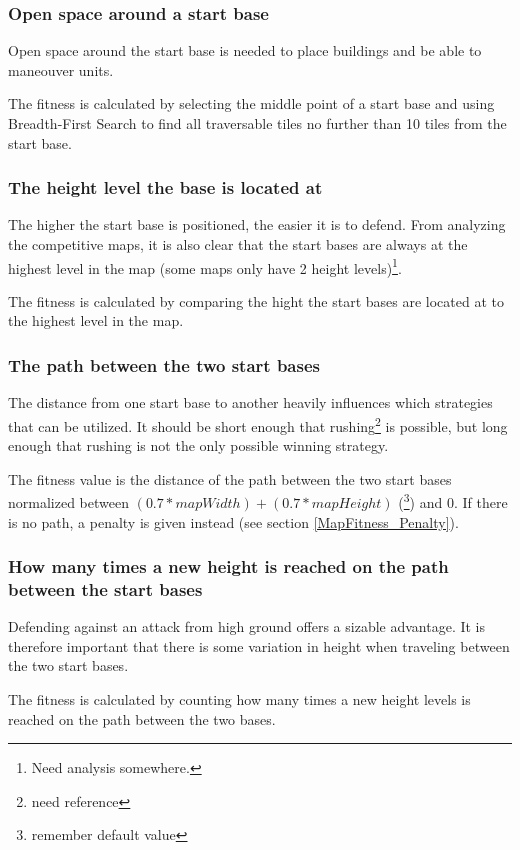	\subsubsection*{Open space around a start base} 
	Open space around the start base is needed to place buildings and be able to maneouver units. 

	The fitness is calculated by selecting the middle point of a start base and using Breadth-First Search to find all traversable tiles no further than 10 tiles from the start base.

	\subsubsection*{The height level the base is located at}
	The higher the start base is positioned, the easier it is to defend. From analyzing the competitive maps, it is also clear that the start bases are always at the highest level in the map (some maps only have 2 height levels)\footnote{Need analysis somewhere.}. 

	The fitness is calculated by comparing the hight the start bases are located at to the highest level in the map. 

	\subsubsection*{The path between the two start bases}
	The distance from one start base to another heavily influences which strategies that can be utilized. It should be short enough that rushing\footnote{need reference} is possible, but long enough that rushing is not the only possible winning strategy. 

	The fitness value is the distance of the path between the two start bases normalized between $(0.7 * mapWidth) + (0.7 * mapHeight)$ (\footnote{remember default value}) and 0. If there is no path, a penalty is given instead (see section \ref{MapFitness_Penalty}).

	\subsubsection*{How many times a new height is reached on the path between the start bases}
	Defending against an attack from high ground offers a sizable advantage. It is therefore important that there is some variation in height when traveling between the two start bases. 

	The fitness is calculated by counting how many times a new height levels is reached on the path between the two bases.

